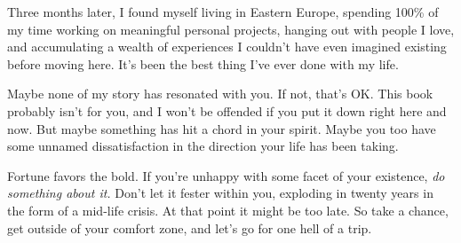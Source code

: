 \documentclass[./the-millions-of-gestures.tex]{subfiles}
\begin{document}
Three months later, I found myself living in Eastern Europe, spending 100\% of
my time working on meaningful personal projects, hanging out with people I love,
and accumulating a wealth of experiences I couldn't have even imagined existing
before moving here. It's been the best thing I've ever done with my life.

Maybe none of my story has resonated with you. If not, that's OK. This book
probably isn't for you, and I won't be offended if you put it down right here
and now. But maybe something has hit a chord in your spirit. Maybe you too have
some unnamed dissatisfaction in the direction your life has been taking.

Fortune favors the bold. If you're unhappy with some facet of your existence,
\emph{do something about it.} Don't let it fester within you, exploding in
twenty years in the form of a mid-life crisis. At that point it might be too
late. So take a chance, get outside of your comfort zone, and let's go for one
hell of a trip.
\end{document}
